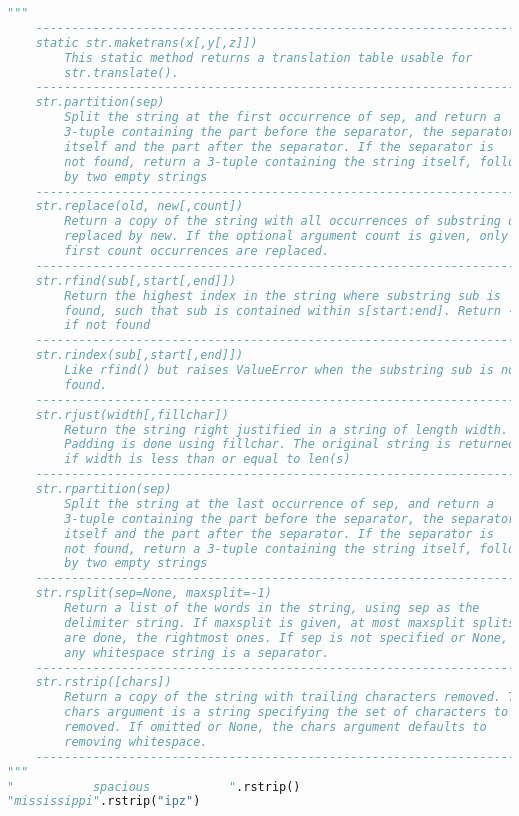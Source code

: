 \documentclass[a4paper,landscape]{report}
\begin{document}
\begin{lstlisting}[language=Python]
"""
    ---------------------------------------------------------------------
    static str.maketrans(x[,y[,z]])
        This static method returns a translation table usable for
        str.translate().
    ---------------------------------------------------------------------
    str.partition(sep)
        Split the string at the first occurrence of sep, and return a
        3-tuple containing the part before the separator, the separator
        itself and the part after the separator. If the separator is
        not found, return a 3-tuple containing the string itself, followed
        by two empty strings
    ---------------------------------------------------------------------
    str.replace(old, new[,count])
        Return a copy of the string with all occurrences of substring old
        replaced by new. If the optional argument count is given, only the
        first count occurrences are replaced.
    ---------------------------------------------------------------------
    str.rfind(sub[,start[,end]])
        Return the highest index in the string where substring sub is
        found, such that sub is contained within s[start:end]. Return -1
        if not found
    ---------------------------------------------------------------------
    str.rindex(sub[,start[,end]])
        Like rfind() but raises ValueError when the substring sub is not
        found.
    ---------------------------------------------------------------------
    str.rjust(width[,fillchar])
        Return the string right justified in a string of length width.
        Padding is done using fillchar. The original string is returned
        if width is less than or equal to len(s)
    ---------------------------------------------------------------------
    str.rpartition(sep)
        Split the string at the last occurrence of sep, and return a
        3-tuple containing the part before the separator, the separator
        itself and the part after the separator. If the separator is
        not found, return a 3-tuple containing the string itself, followed
        by two empty strings
    ---------------------------------------------------------------------
    str.rsplit(sep=None, maxsplit=-1)
        Return a list of the words in the string, using sep as the 
        delimiter string. If maxsplit is given, at most maxsplit splits 
        are done, the rightmost ones. If sep is not specified or None,
        any whitespace string is a separator.
    ---------------------------------------------------------------------
    str.rstrip([chars])
        Return a copy of the string with trailing characters removed. The
        chars argument is a string specifying the set of characters to be
        removed. If omitted or None, the chars argument defaults to 
        removing whitespace.
    ---------------------------------------------------------------------
"""
"           spacious           ".rstrip()
"mississippi".rstrip("ipz")


\end{lstlisting}
\end{document}
